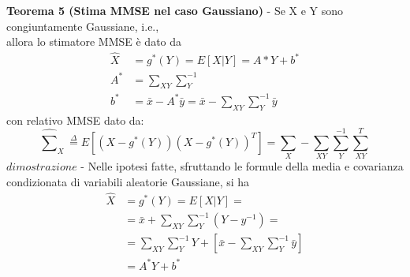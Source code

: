 \textbf{Teorema 5 (Stima MMSE nel caso Gaussiano)} - Se X e Y sono congiuntamente Gaussiane, i.e.,\\
allora lo stimatore MMSE è dato da
\begin{align}
\widehat{X}&=g^*(Y)=E[X|Y]=A*Y+b^*\nonumber\\
A^*&=\sum_{XY}\sum_Y^{-1} \nonumber\\
b^*&=\bar{x}-A^*\bar{y}=\bar{x}-\sum_{XY}\sum_Y^{-1}\bar{y}\nonumber
\end{align}
con relativo MMSE dato da:
\begin{equation}
\widehat{\sum}_X\stackrel{\Delta}{=}E[(X-g^*(Y))(X-g^*(Y))^T]=\sum_X-\sum_{XY}\sum_Y^{-1}\sum_{XY}^T\nonumber
\end{equation}
$dimostrazione $ - Nelle ipotesi fatte, sfruttando le formule della media e covarianza
condizionata di variabili aleatorie Gaussiane, si ha\\
\begin{align}
\widehat{X}&=g^*(Y)=E[X|Y]=\nonumber\\
&=\bar{x}+ \sum_{XY}\sum_Y^{-1}(Y-y^{-1})=\nonumber\\
&=\sum_{XY}\sum_Y^{-1}Y+[\bar{x}-\sum_{XY}\sum_Y^{-1}\bar{y}]\nonumber\\
&=A^*Y+b^* \nonumber
\end{align}


